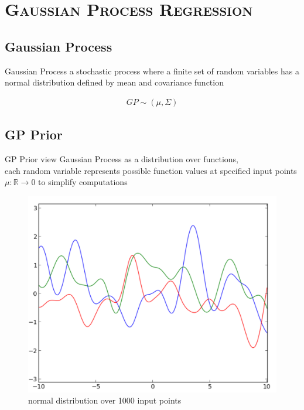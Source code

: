 \documentclass[xcolor=x11names,compress]{beamer}
\begin{document}
    \section{\scshape Gaussian Process Regression}
    \subsection{Gaussian Process}
    \begin{frame}{Gaussian Process}
        a stochastic process where a finite set of random variables has a normal distribution
        defined by mean and covariance function

        \begin{align*}
            GP \sim (\mu, \Sigma)
        \end{align*}
    \end{frame}

    \subsection{GP Prior}
    \begin{frame}{GP Prior}
        view Gaussian Process as a distribution over functions,\\
        each random variable represents possible function values at specified input points
        $\mu : \mathbb{R} \rightarrow 0$ to simplify computations

        \begin{figure}
            \centering
            \includegraphics[width=.6\textwidth]{../resources/figures/gp_prior.pdf}
            \caption{normal distribution over 1000 input points}
        \end{figure}

    \end{frame}
\end{document}
